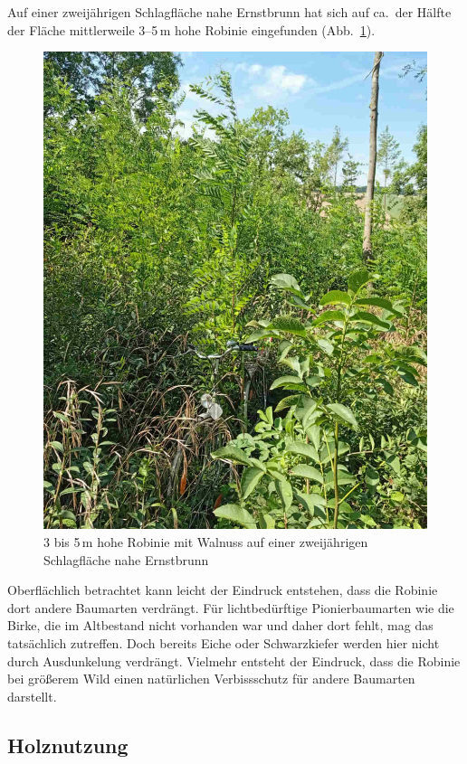 \documentclass[twocolumn]{scrartcl}
\begin{document}
Auf einer zweijährigen Schlagfläche nahe Ernstbrunn hat sich auf
ca.\ der Hälfte der Fläche mittlerweile 3--5\,m hohe Robinie
eingefunden (Abb.~\ref{fig:ernstbrunnSchlagflaeche}).

\begin{figure}[htbp]
  \centering
  \includegraphics[width=.9\linewidth]{./bild/ernstbrunnSchlagflaeche}
  \caption{3 bis 5\,m hohe Robinie mit Walnuss auf einer zweijährigen Schlagfläche nahe Ernstbrunn}
  \label{fig:ernstbrunnSchlagflaeche}
\end{figure}

Oberflächlich betrachtet kann leicht der Eindruck entstehen, dass die
Robinie dort andere Baumarten verdrängt. Für lichtbedürftige
Pionierbaumarten wie die Birke, die im Altbestand nicht vorhanden war
und daher dort fehlt, mag das tatsächlich zutreffen. Doch bereits
Eiche oder Schwarzkiefer werden hier nicht durch Ausdunkelung
verdrängt. Vielmehr entsteht der Eindruck, dass die Robinie bei
größerem Wild einen natürlichen Verbissschutz für andere Baumarten
darstellt.

\subsection{Holznutzung}
\end{document}
